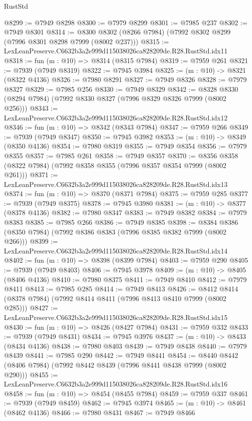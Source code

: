 \begin{lexlean}{RustStd}
\begin{coremodule}
@8299 := @7949 @8298
@8300 := @7979 @8299
@8301 := @7985 @237
@8302 := @7949 @8301
@8314 := @8300 @8302 (@8266 @7984) (@7992 @8302 @8299 (@7996 @8301 @8298 @7999 (@8002 @237)))
@8315 := LexLeanPreserve.C6632b3a2e999d115038026ca828209de.R28.RustStd.idx11
@8318 := fun (m : @10) => @8314 (@8315 @7984)
@8319 := @7959 @261
@8321 := @7939 (@7949 @8319)
@8322 := @7945 @3984
@8325 := (m : @10) -> @8321 (@8322 @4136)
@8326 := @7980 @8291
@8327 := @7949 @8326
@8328 := @7979 @8327
@8329 := @7985 @256
@8330 := @7949 @8329
@8342 := @8328 @8330 (@8294 @7984) (@7992 @8330 @8327 (@7996 @8329 @8326 @7999 (@8002 @256)))
@8343 := LexLeanPreserve.C6632b3a2e999d115038026ca828209de.R28.RustStd.idx12
@8346 := fun (m : @10) => @8342 (@8343 @7984)
@8347 := @7959 @266
@8349 := @7939 (@7949 @8347)
@8350 := @7945 @3982
@8353 := (m : @10) -> @8349 (@8350 @4136)
@8354 := @7980 @8319
@8355 := @7949 @8354
@8356 := @7979 @8355
@8357 := @7985 @261
@8358 := @7949 @8357
@8370 := @8356 @8358 (@8322 @7984) (@7992 @8358 @8355 (@7996 @8357 @8354 @7999 (@8002 @261)))
@8371 := LexLeanPreserve.C6632b3a2e999d115038026ca828209de.R28.RustStd.idx13
@8374 := fun (m : @10) => @8370 (@8371 @7984)
@8375 := @7959 @285
@8377 := @7939 (@7949 @8375)
@8378 := @7945 @3980
@8381 := (m : @10) -> @8377 (@8378 @4136)
@8382 := @7980 @8347
@8383 := @7949 @8382
@8384 := @7979 @8383
@8385 := @7985 @266
@8386 := @7949 @8385
@8398 := @8384 @8386 (@8350 @7984) (@7992 @8386 @8383 (@7996 @8385 @8382 @7999 (@8002 @266)))
@8399 := LexLeanPreserve.C6632b3a2e999d115038026ca828209de.R28.RustStd.idx14
@8402 := fun (m : @10) => @8398 (@8399 @7984)
@8403 := @7959 @290
@8405 := @7939 (@7949 @8403)
@8406 := @7945 @3978
@8409 := (m : @10) -> @8405 (@8406 @4136)
@8410 := @7980 @8375
@8411 := @7949 @8410
@8412 := @7979 @8411
@8413 := @7985 @285
@8414 := @7949 @8413
@8426 := @8412 @8414 (@8378 @7984) (@7992 @8414 @8411 (@7996 @8413 @8410 @7999 (@8002 @285)))
@8427 := LexLeanPreserve.C6632b3a2e999d115038026ca828209de.R28.RustStd.idx15
@8430 := fun (m : @10) => @8426 (@8427 @7984)
@8431 := @7959 @332
@8433 := @7939 (@7949 @8431)
@8434 := @7945 @3976
@8437 := (m : @10) -> @8433 (@8434 @4136)
@8438 := @7980 @8403
@8439 := @7949 @8438
@8440 := @7979 @8439
@8441 := @7985 @290
@8442 := @7949 @8441
@8454 := @8440 @8442 (@8406 @7984) (@7992 @8442 @8439 (@7996 @8441 @8438 @7999 (@8002 @290)))
@8455 := LexLeanPreserve.C6632b3a2e999d115038026ca828209de.R28.RustStd.idx16
@8458 := fun (m : @10) => @8454 (@8455 @7984)
@8459 := @7959 @337
@8461 := @7939 (@7949 @8459)
@8462 := @7945 @3974
@8465 := (m : @10) -> @8461 (@8462 @4136)
@8466 := @7980 @8431
@8467 := @7949 @8466

\end{coremodule}
\end{lexlean}

